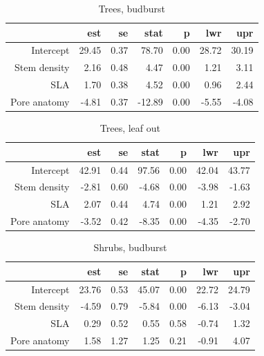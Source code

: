 \documentclass[12pt]{article}
\begin{document}
\begin{table}[ht]
\centering
\caption{Trees, budburst} 
\begin{tabular}{rrrrrrr}
  \hline
 & est & se & stat & p & lwr & upr \\ 
  \hline
Intercept & 29.45 & 0.37 & 78.70 & 0.00 & 28.72 & 30.19 \\ 
  Stem density & 2.16 & 0.48 & 4.47 & 0.00 & 1.21 & 3.11 \\ 
  SLA & 1.70 & 0.38 & 4.52 & 0.00 & 0.96 & 2.44 \\ 
  Pore anatomy & -4.81 & 0.37 & -12.89 & 0.00 & -5.55 & -4.08 \\ 
   \hline
\end{tabular}
\end{table}%
\begin{table}[ht]
\centering
\caption{Trees, leaf out} 
\begin{tabular}{rrrrrrr}
  \hline
 & est & se & stat & p & lwr & upr \\ 
  \hline
Intercept & 42.91 & 0.44 & 97.56 & 0.00 & 42.04 & 43.77 \\ 
  Stem density & -2.81 & 0.60 & -4.68 & 0.00 & -3.98 & -1.63 \\ 
  SLA & 2.07 & 0.44 & 4.74 & 0.00 & 1.21 & 2.92 \\ 
  Pore anatomy & -3.52 & 0.42 & -8.35 & 0.00 & -4.35 & -2.70 \\ 
   \hline
\end{tabular}
\end{table}%
\begin{table}[ht]
\centering
\caption{Shrubs, budburst} 
\begin{tabular}{rrrrrrr}
  \hline
 & est & se & stat & p & lwr & upr \\ 
  \hline
Intercept & 23.76 & 0.53 & 45.07 & 0.00 & 22.72 & 24.79 \\ 
  Stem density & -4.59 & 0.79 & -5.84 & 0.00 & -6.13 & -3.04 \\ 
  SLA & 0.29 & 0.52 & 0.55 & 0.58 & -0.74 & 1.32 \\ 
  Pore anatomy & 1.58 & 1.27 & 1.25 & 0.21 & -0.91 & 4.07 \\ 
   \hline
\end{tabular}
\end{table}%
\end{document}
